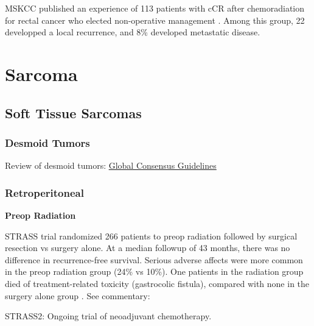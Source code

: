 \documentclass[
]{book}
\begin{document}
MSKCC published an experience of 113 patients with cCR after chemoradiation for rectal cancer who elected non-operative management \citep{smithe184896}. Among this group, 22 developped a local recurrence, and 8\% developed metastatic disease.\citep{smith657}

\hypertarget{part-sarcoma}{%
\part*{Sarcoma}\label{part-sarcoma}}

\hypertarget{soft-tissue-sarcomas}{%
\chapter{Soft Tissue Sarcomas}\label{soft-tissue-sarcomas}}

\hypertarget{desmoid-tumors}{%
\section{Desmoid Tumors}\label{desmoid-tumors}}

Review of desmoid tumors: \href{https://www.ejcancer.com/article/S0959-8049(19)30832-9/fulltext}{Global Consensus Guidelines}

\hypertarget{retroperitoneal}{%
\section{Retroperitoneal}\label{retroperitoneal}}

\textbf{Preop Radiation}

STRASS trial randomized 266 patients to preop radiation followed by surgical resection vs surgery alone. At a median followup of 43 months, there was no difference in recurrence-free survival. Serious adverse affects were more common in the preop radiation group (24\% vs 10\%). One patients in the radiation group died of treatment-related toxicity (gastrocolic fistula), compared with none in the surgery alone group \citep{bonvalot1366}. See commentary: \citep{cardona1257}

STRASS2: Ongoing trial of neoadjuvant chemotherapy.

  
\end{document}
